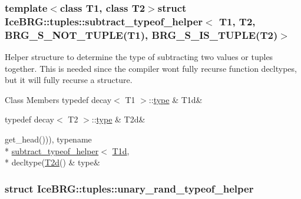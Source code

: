 \subsubsection*{template$<$class T1, class T2$>$struct Ice\+B\+R\+G\+::tuples\+::subtract\+\_\+typeof\+\_\+helper$<$ T1, T2, B\+R\+G\+\_\+\+S\+\_\+\+N\+O\+T\+\_\+\+T\+U\+P\+L\+E(\+T1), B\+R\+G\+\_\+\+S\+\_\+\+I\+S\+\_\+\+T\+U\+P\+L\+E(\+T2)$>$}

Helper structure to determine the type of subtracting two values or tuples together. This is needed since the compiler won\textquotesingle{}t fully recurse function decltypes, but it will fully recurse a structure. \begin{DoxyFields}{Class Members}
\hypertarget{namespaceIceBRG_1_1tuples_a3a6088841c87612c4979848427bbfffa}{}typedef decay$<$ T1 $>$\+::\hyperlink{namespaceIceBRG_1_1tuples_a456742eecd7ca819fae5ff7f63a4b789}{type}\label{namespaceIceBRG_1_1tuples_a3a6088841c87612c4979848427bbfffa}
&
T1d&
\\
\hline

\hypertarget{namespaceIceBRG_1_1tuples_a20517a7169e509c9854375d1329461b8}{}typedef decay$<$ T2 $>$\+::\hyperlink{namespaceIceBRG_1_1tuples_a456742eecd7ca819fae5ff7f63a4b789}{type}\label{namespaceIceBRG_1_1tuples_a20517a7169e509c9854375d1329461b8}
&
T2d&
\\
\hline

\hypertarget{namespaceIceBRG_1_1tuples_a456742eecd7ca819fae5ff7f63a4b789}{}get\+\_\+head())), typename \\*
\hyperlink{namespaceIceBRG_1_1tuples_structIceBRG_1_1tuples_1_1subtract__typeof__helper}{subtract\+\_\+typeof\+\_\+helper}$<$ \hyperlink{namespaceIceBRG_1_1tuples_a3a6088841c87612c4979848427bbfffa}{T1d}, \\*
decltype(\hyperlink{namespaceIceBRG_1_1tuples_a20517a7169e509c9854375d1329461b8}{T2d}()\label{namespaceIceBRG_1_1tuples_a456742eecd7ca819fae5ff7f63a4b789}
&
type&
\\
\hline

\end{DoxyFields}
\label{structIceBRG_1_1tuples_1_1unary__rand__typeof__helper}
\hypertarget{namespaceIceBRG_1_1tuples_structIceBRG_1_1tuples_1_1unary__rand__typeof__helper}{}
\subsubsection{struct Ice\+B\+R\+G\+:\+:tuples\+:\+:unary\+\_\+rand\+\_\+typeof\+\_\+helper}
